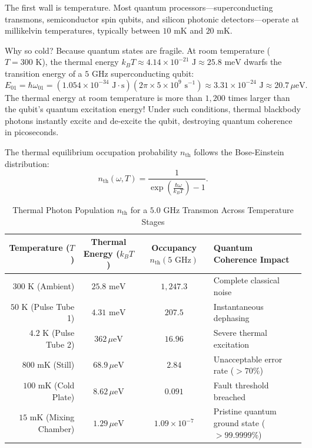 The first wall is temperature. Most quantum processors---superconducting transmons, semiconductor spin qubits, and silicon photonic detectors---operate at millikelvin temperatures, typically between $10\text{ mK}$ and $20\text{ mK}$.

Why so cold? Because quantum states are fragile. At room temperature ($T = 300\text{ K}$), the thermal energy $k_B T \approx 4.14 \times 10^{-21}\text{ J} \approx 25.8\text{ meV}$ dwarfs the transition energy of a $5\text{ GHz}$ superconducting qubit:
\begin{equation}
    E_{01} = \hbar \omega_{01} = (1.054 \times 10^{-34}\text{ J}\cdot\text{s})(2\pi \times 5 \times 10^9\text{ s}^{-1}) \approx 3.31 \times 10^{-24}\text{ J} \approx 20.7\,\mu\text{eV}.
    \label{eq:qubit_transition_energy}
\end{equation}
The thermal energy at room temperature is more than $1{,}200$ times larger than the qubit's quantum excitation energy! Under such conditions, thermal blackbody photons instantly excite and de-excite the qubit, destroying quantum coherence in picoseconds.

The thermal equilibrium occupation probability $n_{\text{th}}$ follows the Bose-Einstein distribution:
\begin{equation}
    n_{\text{th}}(\omega, T) = \frac{1}{\exp\left(\frac{\hbar \omega}{k_B T}\right) - 1}.
    \label{eq:bose_einstein_thermal_photons}
\end{equation}

\begin{table}[htbp]
\centering
\caption{Thermal Photon Population $n_{\text{th}}$ for a $5.0\text{ GHz}$ Transmon Across Temperature Stages}
\label{tab:thermal_photon_occupancy}
\begin{tabular}{r c c l}
\toprule
\textbf{Temperature ($T$)} & \textbf{Thermal Energy ($k_B T$)} & \textbf{Occupancy $n_{\text{th}}(5\text{ GHz})$} & \textbf{Quantum Coherence Impact} \\
\midrule
$300\text{ K}$ (Ambient) & $25.8\text{ meV}$ & $1{,}247.3$ & Complete classical noise \\
$50\text{ K}$ (Pulse Tube 1) & $4.31\text{ meV}$ & $207.5$ & Instantaneous dephasing \\
$4.2\text{ K}$ (Pulse Tube 2) & $362\,\mu\text{eV}$ & $16.96$ & Severe thermal excitation \\
$800\text{ mK}$ (Still) & $68.9\,\mu\text{eV}$ & $2.84$ & Unacceptable error rate ($>70\%$) \\
$100\text{ mK}$ (Cold Plate) & $8.62\,\mu\text{eV}$ & $0.091$ & Fault threshold breached \\
$15\text{ mK}$ (Mixing Chamber) & $1.29\,\mu\text{eV}$ & $1.09 \times 10^{-7}$ & Pristine quantum ground state ($>99.9999\%$) \\
\bottomrule
\end{tabular}
\end{table}

